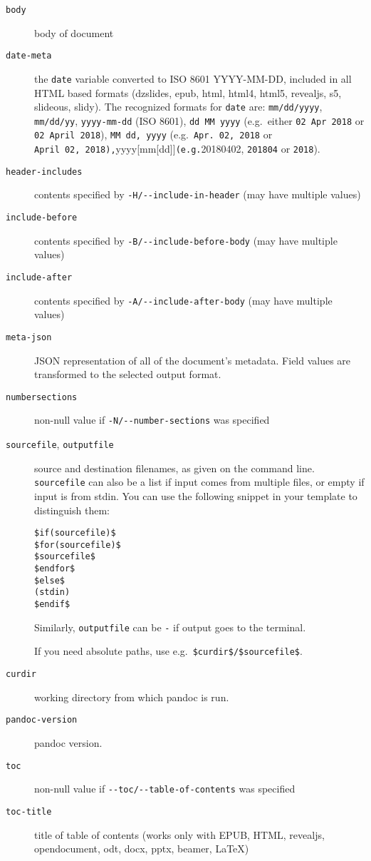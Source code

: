 \documentclass[
  a4paper,
]{article}
\begin{document}
\begin{description}
\item[\texttt{body}]
body of document
\item[\texttt{date-meta}]
the \texttt{date} variable converted to ISO 8601 YYYY-MM-DD, included in
all HTML based formats (dzslides, epub, html, html4, html5, revealjs,
s5, slideous, slidy). The recognized formats for \texttt{date} are:
\texttt{mm/dd/yyyy}, \texttt{mm/dd/yy}, \texttt{yyyy-mm-dd} (ISO 8601),
\texttt{dd\ MM\ yyyy} (e.g.~either \texttt{02\ Apr\ 2018} or
\texttt{02\ April\ 2018}), \texttt{MM\ dd,\ yyyy}
(e.g.~\texttt{Apr.\ 02,\ 2018} or
\texttt{April\ 02,\ 2018),}yyyy{[}mm{[}dd{]}{]}\texttt{(e.g.}20180402,
\texttt{201804} or \texttt{2018}).
\item[\texttt{header-includes}]
contents specified by \texttt{-H/-\/-include-in-header} (may have
multiple values)
\item[\texttt{include-before}]
contents specified by \texttt{-B/-\/-include-before-body} (may have
multiple values)
\item[\texttt{include-after}]
contents specified by \texttt{-A/-\/-include-after-body} (may have
multiple values)
\item[\texttt{meta-json}]
JSON representation of all of the document's metadata. Field values are
transformed to the selected output format.
\item[\texttt{numbersections}]
non-null value if \texttt{-N/-\/-number-sections} was specified
\item[\texttt{sourcefile}, \texttt{outputfile}]
source and destination filenames, as given on the command line.
\texttt{sourcefile} can also be a list if input comes from multiple
files, or empty if input is from stdin. You can use the following
snippet in your template to distinguish them:

\begin{verbatim}
$if(sourcefile)$
$for(sourcefile)$
$sourcefile$
$endfor$
$else$
(stdin)
$endif$
\end{verbatim}

Similarly, \texttt{outputfile} can be \texttt{-} if output goes to the
terminal.

If you need absolute paths, use e.g.~\texttt{\$curdir\$/\$sourcefile\$}.
\item[\texttt{curdir}]
working directory from which pandoc is run.
\item[\texttt{pandoc-version}]
pandoc version.
\item[\texttt{toc}]
non-null value if \texttt{-\/-toc/-\/-table-of-contents} was specified
\item[\texttt{toc-title}]
title of table of contents (works only with EPUB, HTML, revealjs,
opendocument, odt, docx, pptx, beamer, LaTeX)
\end{description}
\end{document}
